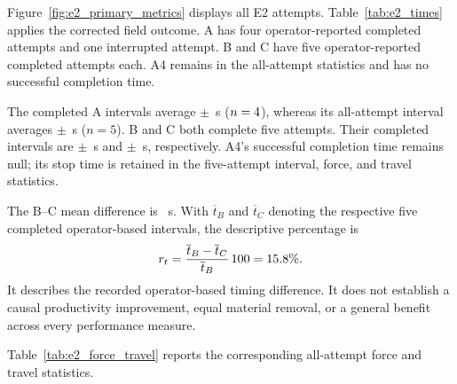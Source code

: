 Figure~\ref{fig:e2_primary_metrics} displays all E2 attempts. Table~\ref{tab:e2_times} applies the corrected field outcome. A has four operator-reported completed attempts and one interrupted attempt. B and C have five operator-reported completed attempts each. A4 remains in the all-attempt statistics and has no successful completion time.

\begin{table}[H]\centering\footnotesize
\caption[E2 corrected completion, timing, and peaks]{E2 results with A4 corrected to incomplete release and operator interruption. Completed-time statistics use A \(n=4\), B/C \(n=5\). Mean observed peak is the mean of the five per-run peaks in every condition, including A4, not the whole-signal mean or pooled maximum. Values are mean \(\pm\) sample SD.}
\label{tab:e2_times}

\end{table}

The completed A intervals average \EtwoATime\(\pm\)\EtwoATimeSD~s (\(n=4\)), whereas its all-attempt interval averages \EtwoAInterval\(\pm\)\EtwoAIntervalSD~s (\(n=5\)). B and C both complete five attempts. Their completed intervals are \EtwoBTime\(\pm\)\EtwoBTimeSD~s and \EtwoCTime\(\pm\)\EtwoCTimeSD~s, respectively. A4's successful completion time remains null; its stop time is retained in the five-attempt interval, force, and travel statistics.

The B--C mean difference is \BCSeconds~s. With \(\overline t_B\) and \(\overline t_C\) denoting the respective five completed operator-based intervals, the descriptive percentage is
\begin{equation}
 r_t=\frac{\overline t_B-\overline t_C}{\overline t_B}\,100
     =15.8\%.
 \label{eq:bc_time_difference}
\end{equation}
It describes the recorded operator-based timing difference. It does not establish a causal productivity improvement, equal material removal, or a general benefit across every performance measure.


Table~\ref{tab:e2_force_travel} reports the corresponding all-attempt force and travel statistics.

\begin{table}[tbp]\centering\footnotesize
\caption[E2 all-attempt force and travel]{E2 all-attempt force and motion statistics, \(n=5\) per condition. ``Peak'' is the mean of per-run measured peaks. Whole-window mean force includes approach and exit and is not a contact-only force-quality measure.}
\label{tab:e2_force_travel}

\end{table}

